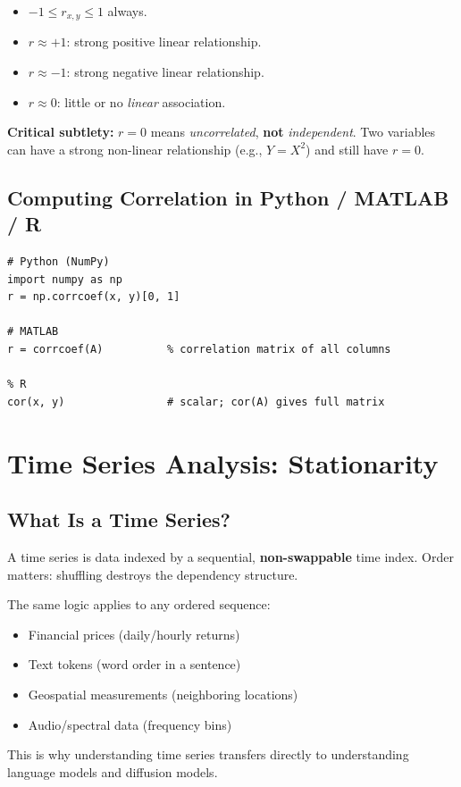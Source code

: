 \documentclass[11pt]{article}
\begin{document}
\begin{itemize}
    \item $-1 \leq r_{x,y} \leq 1$ always.
    \item $r \approx +1$: strong positive linear relationship.
    \item $r \approx -1$: strong negative linear relationship.
    \item $r \approx 0$: little or no \emph{linear} association.
\end{itemize}

\textbf{Critical subtlety:} $r = 0$ means \emph{uncorrelated}, \textbf{not}
\emph{independent}. Two variables can have a strong non-linear relationship
(e.g., $Y = X^2$) and still have $r = 0$.

\subsection{Computing Correlation in Python / MATLAB / R}

\begin{verbatim}
# Python (NumPy)
import numpy as np
r = np.corrcoef(x, y)[0, 1]

# MATLAB
r = corrcoef(A)          % correlation matrix of all columns

% R
cor(x, y)                # scalar; cor(A) gives full matrix
\end{verbatim}

\newpage
\section{Time Series Analysis: Stationarity}

\subsection{What Is a Time Series?}
A time series is data indexed by a sequential, \textbf{non-swappable} time index.
Order matters: shuffling destroys the dependency structure.

The same logic applies to any ordered sequence:
\begin{itemize}
    \item Financial prices (daily/hourly returns)
    \item Text tokens (word order in a sentence)
    \item Geospatial measurements (neighboring locations)
    \item Audio/spectral data (frequency bins)
\end{itemize}
This is why understanding time series transfers directly to understanding
language models and diffusion models.
\end{document}
